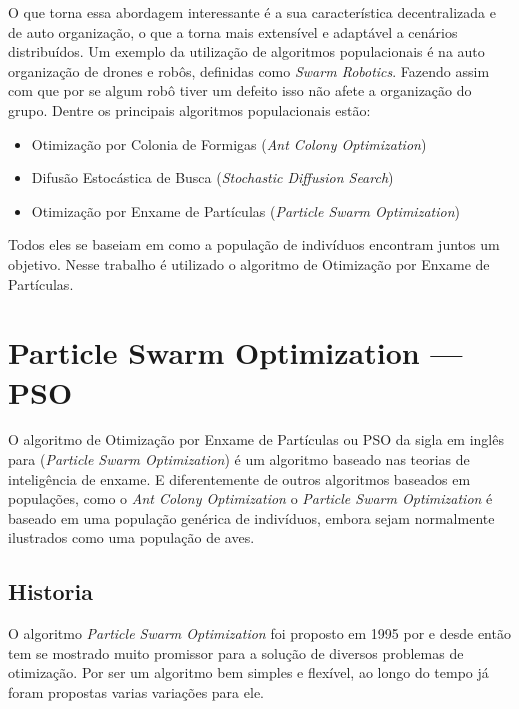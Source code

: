         O que torna essa abordagem interessante é a sua característica decentralizada e de auto organização, o que a torna mais extensível e adaptável a cenários distribuídos. Um exemplo da utilização de algoritmos populacionais é na auto organização de drones e robôs, definidas como \textit{Swarm Robotics}. Fazendo assim com que por se algum robô tiver um defeito isso não afete a organização do grupo.\newline
        Dentre os principais algoritmos populacionais estão:
        \begin{itemize}
            \item Otimização por Colonia de Formigas (\textit{Ant Colony Optimization}) 
            \item Difusão Estocástica de Busca (\textit{Stochastic Diffusion Search})
            \item Otimização por Enxame de Partículas (\textit{Particle Swarm Optimization})
        \end{itemize}
        
        Todos eles se baseiam em como a população de indivíduos encontram juntos um objetivo. Nesse trabalho é utilizado o algoritmo de Otimização por Enxame de Partículas. 


\section{Particle Swarm Optimization — PSO}
        O algoritmo de Otimização por Enxame de Partículas ou PSO da sigla em inglês para (\textit{Particle Swarm Optimization}) é um algoritmo baseado nas teorias de inteligência de enxame. E diferentemente de outros algoritmos baseados em populações, como o \textit{Ant Colony Optimization} o \textit{Particle Swarm Optimization} é baseado em uma população genérica de indivíduos, embora sejam normalmente ilustrados como uma população de aves.


    \subsection{Historia}
        O algoritmo \textit{Particle Swarm Optimization} foi proposto em 1995 por \cite{Kennedy1995} e desde então tem se mostrado muito promissor para a solução de diversos problemas de otimização. Por ser um algoritmo bem simples e flexível, ao longo do tempo já foram propostas varias variações para ele.\hfill\vspace{\onelineskip}
        
